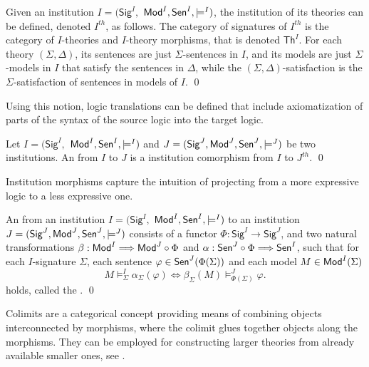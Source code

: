 \documentclass[10pt,fleqn,final]{scrreprt}
\newcommand{\Sig}{\mathsf{Sig}}
\renewcommand{\Th}{\mathsf{Th}}
\newenvironment{definitions}[0]{\medskip }{}
\begin{document}
\begin{definitions}
\begin{definition}
  Given an institution  $I = (\Sig^I,$ $ \mathsf{Mod}^I, \mathsf{Sen}^I, \models^I)$, the
   institution of its theories can be defined, denoted $I^{th}$, as follows. The category of signatures of $I^{th}$ is the category
   of $I$-theories and $I$-theory morphisms, that  is denoted $\Th^I$.
   For each theory $(\Sigma, \Delta)$, its sentences are just $\Sigma$-sentences in $I$, and
   its models are just $\Sigma$-models in $I$ that satisfy the sentences in $\Delta$, while the
   $(\Sigma,\Delta)$-satisfaction is the $\Sigma$-satisfaction of sentences in models of $I$.
\qed \end{definition}

Using this notion, logic translations can be defined that include axiomatization of parts of the
syntax of the source logic into the target logic.

\begin{definition}

 Let $I = (\Sig^I,$ $ \mathsf{Mod}^I, \mathsf{Sen}^I, \models^I)$ and $J = (\Sig^J, \Mod^J,
\Sen^J, \models^J)$ be two institutions. An  from $I$ to
$J$ is a institution comorphism from $I$ to $J^{th}$.
\qed\end{definition}

\medskip

Institution morphisms capture the intuition of projecting from a more expressive logic to a less expressive one.

\begin{definition} 
An  from an institution $I = (\Sig^I,$ $ \mathsf{Mod}^I, \mathsf{Sen}^I, \models^I)$ to
an institution $J = (\Sig^J, \Mod^J,
\Sen^J, \models^J)$ consists of a functor $\Phi : \Sig^I \longrightarrow \Sig^J$, and two
natural transformations $\beta: \mathsf{Mod}^I \Longrightarrow \mathsf{Mod}^J \circ \Phi$
and $\alpha:  \mathsf{Sen}^J \circ \Phi \Longrightarrow \mathsf{Sen}^I $, such that for each $I$-signature $\Sigma$, each sentence $\varphi\in\mathsf{Sen}^J(\Phi(\Sigma))$ and each model $M\in\mathsf{Mod}^I(\Sigma)$
$$ M\models^{I}_{\Sigma}\alpha_{\Sigma}(\varphi) \Leftrightarrow
\beta_{\Sigma}(M)\models^J_{\Phi(\Sigma)}\varphi.
$$
holds, called the .
\qed\end{definition}

Colimits are a categorical concept providing means of
combining objects interconnected by morphisms, where the colimit
glues together objects along the morphisms.
They can be employed for constructing larger theories from already available 
smaller ones, see \cite{GoguenBurstall92}. 


\end{definitions}
\end{document}
